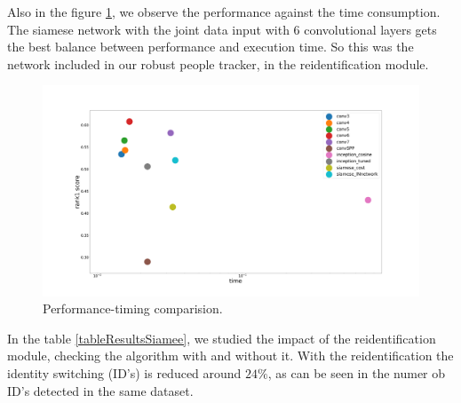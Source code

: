 Also in the figure \ref{lossesSiam3}, we observe the performance against the time consumption. The siamese network with the joint data input with $6$ convolutional layers gets the best balance between performance and execution time. So this was the network included in our robust people tracker, in the reidentification module.

\begin{figure}[hptb]
\centering         
\includegraphics[width=15cm]{siameseDev/graps2.png}
\caption{Performance-timing comparision.} \label{lossesSiam3}
\end{figure}




In the table \ref{tableResultsSiamee}, we studied the impact of the reidentification module, checking the algorithm with and without it. With the reidentification the identity switching (ID's) is reduced around $24 \%$, as can be seen in the numer ob ID's detected in the same dataset.


\begin{table}[H]
\centering

\caption{Impact of the reidentification module.}
\label{tableResultsSiamee}
\end{table}

